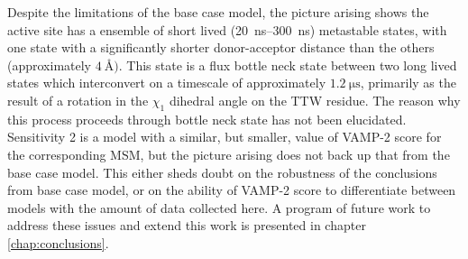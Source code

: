 Despite the limitations of the base case model, the picture arising shows the active site has a ensemble of short lived (\SIrange{20}{300}{\nano\second}) metastable states, with one state with a significantly shorter donor-acceptor distance than the others (approximately $\SI{4}{\angstrom})$. This state is a flux bottle neck state between two long lived states which interconvert on a timescale of approximately $\SI{1.2}{\micro\second}$, primarily as the result of a rotation in the $\chi_1$ dihedral angle on the TTW residue. The reason why this process proceeds through bottle neck state has not been elucidated. Sensitivity 2 is a model with a similar, but smaller, value of VAMP-2 score for the corresponding MSM, but the picture arising does not back up that from the base case model. This either sheds doubt on the robustness of the conclusions from base case model, or on the ability of VAMP-2 score to differentiate between models with the amount of data collected here. A program of future work to address these issues and extend this work is presented in chapter \ref{chap:conclusions}.  










